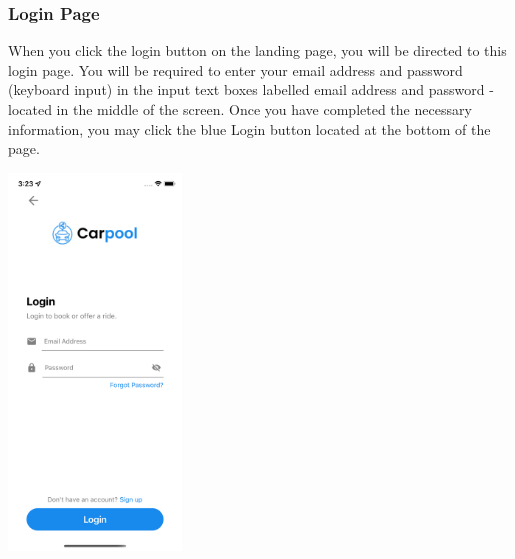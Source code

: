 \documentclass[hidelinks, 12pt, a4paper]{article}
\begin{document}
\subsubsection{Login Page}
When you click the login button on the landing page, you will be directed to this login page. You will be required to enter your email address and password (keyboard input) in the input text boxes labelled email address and password - located in the middle of the screen. Once you have completed the necessary information, you may click the blue Login button located at the bottom of the page.
\begin{center}
  \includegraphics[height=10cm]{images/Simulator Screen Shot - iPhone X - 2022-06-10 at 03.23.09.png}
\end{center}
\vspace{1cm}
\end{document}
